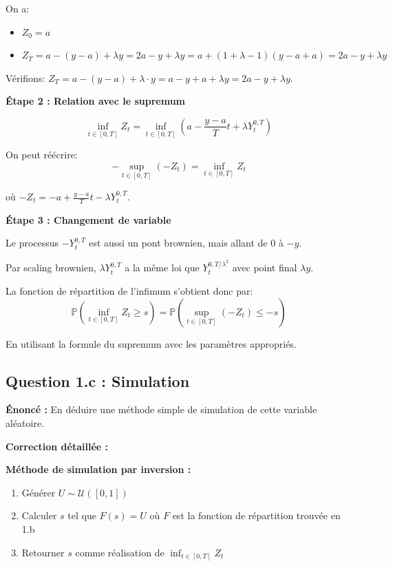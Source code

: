 \documentclass[12pt,a4paper]{article}
\theoremstyle{definition}
\newcommand{\prob}{\mathbb{P}}
\begin{document}
On a:
\begin{itemize}
    \item $Z_0 = a$
    \item $Z_T = a - (y-a) + \lambda y = 2a - y + \lambda y = a + (1+\lambda-1)(y-a+a) = 2a - y + \lambda y$
\end{itemize}

Vérifions: $Z_T = a - (y-a) + \lambda \cdot y = a - y + a + \lambda y = 2a - y + \lambda y$.

\textbf{Étape 2 : Relation avec le supremum}

\[
\inf_{t \in [0,T]} Z_t = \inf_{t \in [0,T]} \left( a - \frac{y-a}{T}t + \lambda Y_t^{0,T} \right)
\]

On peut réécrire:
\[
-\sup_{t \in [0,T]} (-Z_t) = \inf_{t \in [0,T]} Z_t
\]

où $-Z_t = -a + \frac{y-a}{T}t - \lambda Y_t^{0,T}$.

\textbf{Étape 3 : Changement de variable}

Le processus $-Y_t^{0,T}$ est aussi un pont brownien, mais allant de 0 à $-y$.

Par scaling brownien, $\lambda Y_t^{0,T}$ a la même loi que $Y_t^{0, T/\lambda^2}$ avec point final $\lambda y$.

La fonction de répartition de l'infimum s'obtient donc par:
\[
\prob\left( \inf_{t \in [0,T]} Z_t \geq s \right) = \prob\left( \sup_{t \in [0,T]} (-Z_t) \leq -s \right)
\]

En utilisant la formule du supremum avec les paramètres appropriés.

\subsection{Question 1.c : Simulation}

\textbf{Énoncé :} En déduire une méthode simple de simulation de cette variable aléatoire.

\textbf{Correction détaillée :}

\textbf{Méthode de simulation par inversion :}

\begin{enumerate}
    \item Générer $U \sim \mathcal{U}([0,1])$
    \item Calculer $s$ tel que $F(s) = U$ où $F$ est la fonction de répartition trouvée en 1.b
    \item Retourner $s$ comme réalisation de $\inf_{t \in [0,T]} Z_t$
\end{enumerate}
\end{document}
